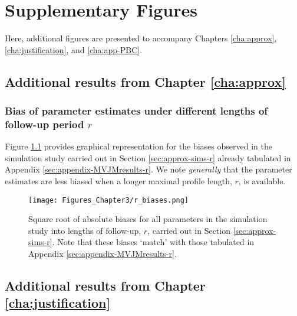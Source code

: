 \chapter{Supplementary Figures}\label{cha:appendix-supplementary-figures}
Here, additional figures are presented to accompany Chapters \ref{cha:approx}, \ref{cha:justification}, and \ref{cha:app-PBC}.

\section{Additional results from Chapter \ref{cha:approx}}\label{sec:appendix-suppfigs-approx}
\rmtoc
\subsection{Bias of parameter estimates under different lengths of follow-up period \texorpdfstring{$r$}{r}}
Figure \ref{fig:appendix-MVJMresults-r} provides graphical representation for the biases observed in the simulation study carried out in Section \ref{sec:approx-sims-r} already tabulated in Appendix \ref{sec:appendix-MVJMresults-r}. We note \textit{generally} that the parameter estimates are less biased when a longer maximal profile length, $r$, is available.
\begin{figure}
    \centering
    \texttt{[image: Figures\_Chapter3/r\_biases.png]}
    \caption{Square root of absolute biases for all parameters in the simulation study into lengths of follow-up, $r$, carried out in Section \ref{sec:approx-sims-r}. Note that these biases `match' with those tabulated in Appendix \ref{sec:appendix-MVJMresults-r}.}
    \label{fig:appendix-MVJMresults-r}
\end{figure}
\clearpage
\resettocappx


\section{Additional results from Chapter \ref{cha:justification}}\label{sec:appendix-suppfigs-justification}
\rmtoc
